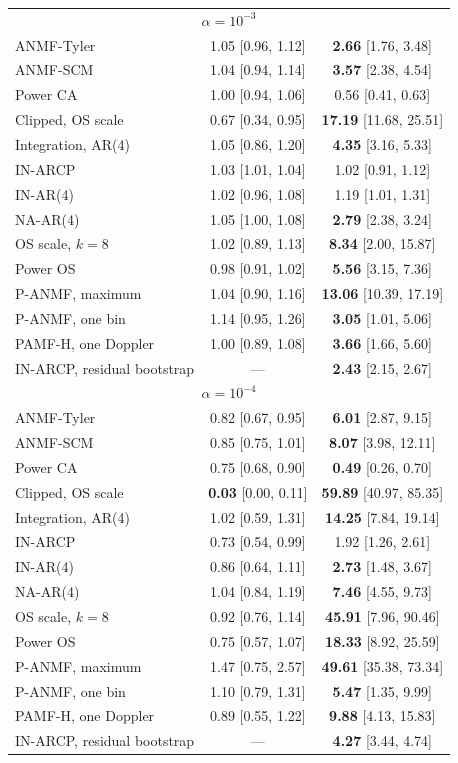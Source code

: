 \documentclass[10pt]{article}
\begin{document}
\begin{table}[htbp]
\begin{tabular}{lcc}
\midrule\multicolumn{3}{c}{$\alpha=10^{-3}$}\\
ANMF-Tyler & 1.05 [0.96, 1.12] & \textbf{2.66} [1.76, 3.48] \\
ANMF-SCM & 1.04 [0.94, 1.14] & \textbf{3.57} [2.38, 4.54] \\
Power CA & 1.00 [0.94, 1.06] & 0.56 [0.41, 0.63] \\
Clipped, OS scale & 0.67 [0.34, 0.95] & \textbf{17.19} [11.68, 25.51] \\
Integration, AR(4) & 1.05 [0.86, 1.20] & \textbf{4.35} [3.16, 5.33] \\
IN-ARCP & 1.03 [1.01, 1.04] & 1.02 [0.91, 1.12] \\
IN-AR(4) & 1.02 [0.96, 1.08] & 1.19 [1.01, 1.31] \\
NA-AR(4) & 1.05 [1.00, 1.08] & \textbf{2.79} [2.38, 3.24] \\
OS scale, $k=8$ & 1.02 [0.89, 1.13] & \textbf{8.34} [2.00, 15.87] \\
Power OS & 0.98 [0.91, 1.02] & \textbf{5.56} [3.15, 7.36] \\
P-ANMF, maximum & 1.04 [0.90, 1.16] & \textbf{13.06} [10.39, 17.19] \\
P-ANMF, one bin & 1.14 [0.95, 1.26] & \textbf{3.05} [1.01, 5.06] \\
PAMF-H, one Doppler & 1.00 [0.89, 1.08] & \textbf{3.66} [1.66, 5.60] \\
IN-ARCP, residual bootstrap & --- & \textbf{2.43} [2.15, 2.67] \\
\midrule\multicolumn{3}{c}{$\alpha=10^{-4}$}\\
ANMF-Tyler & 0.82 [0.67, 0.95] & \textbf{6.01} [2.87, 9.15] \\
ANMF-SCM & 0.85 [0.75, 1.01] & \textbf{8.07} [3.98, 12.11] \\
Power CA & 0.75 [0.68, 0.90] & \textbf{0.49} [0.26, 0.70] \\
Clipped, OS scale & \textbf{0.03} [0.00, 0.11] & \textbf{59.89} [40.97, 85.35] \\
Integration, AR(4) & 1.02 [0.59, 1.31] & \textbf{14.25} [7.84, 19.14] \\
IN-ARCP & 0.73 [0.54, 0.99] & 1.92 [1.26, 2.61] \\
IN-AR(4) & 0.86 [0.64, 1.11] & \textbf{2.73} [1.48, 3.67] \\
NA-AR(4) & 1.04 [0.84, 1.19] & \textbf{7.46} [4.55, 9.73] \\
OS scale, $k=8$ & 0.92 [0.76, 1.14] & \textbf{45.91} [7.96, 90.46] \\
Power OS & 0.75 [0.57, 1.07] & \textbf{18.33} [8.92, 25.59] \\
P-ANMF, maximum & 1.47 [0.75, 2.57] & \textbf{49.61} [35.38, 73.34] \\
P-ANMF, one bin & 1.10 [0.79, 1.31] & \textbf{5.47} [1.35, 9.99] \\
PAMF-H, one Doppler & 0.89 [0.55, 1.22] & \textbf{9.88} [4.13, 15.83] \\
IN-ARCP, residual bootstrap & --- & \textbf{4.27} [3.44, 4.74] \\
\bottomrule
\end{tabular}
\end{table}
\end{document}
